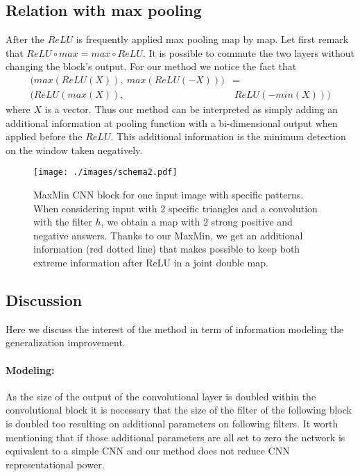 \documentclass{article}
\begin{document}
\vspace*{-0.6cm}
\subsection{Relation with max pooling}
\label{sssec:subsubhead}
After the $ReLU$ is frequently applied max pooling map by map. Let first remark that $ReLU \circ max = max \circ ReLU$. It is possible to commute the two layers without changing the block's output. For our method we notice the fact that 
\begin{align*}
\Big(max (ReLU(X)),\ max (ReLU(-X))\Big) &= \\ 
 \Big(ReLU (max(X)),&\ ReLU (-min(X))\Big)
\end{align*}
where $X$ is a vector. Thus our method can be interpreted as simply adding an additional information at pooling function with a bi-dimensional output when applied before the $ReLU$. This additional information is the minimum detection on the window taken negatively. 

\begin{figure*}[htb]
\centering
   \texttt{[image: ./images/schema2.pdf]}
\caption{MaxMin CNN block for one input image with specific patterns. When considering input with 2 specific triangles and a convolution with the filter $h$, we obtain a map with 2 strong positive and negative answers. Thanks to our MaxMin, we get an additional information (red dotted line) that makes possible to keep both extreme information after ReLU in a joint double map.}
\label{scheme2}
\end{figure*}

\subsection{Discussion}
Here we discuss the interest of the method in term of information modeling the generalization improvement.
\vspace*{-0.3cm}\paragraph*{Modeling:}
As the size of the output of the convolutional layer is doubled within the convolutional block it is necessary that the size of the filter of the following block is doubled too resulting on additional parameters on following filters. It worth mentioning that if those additional parameters are all set to zero the network is equivalent to a simple CNN and our method does not reduce CNN representational power. 
\end{document}
